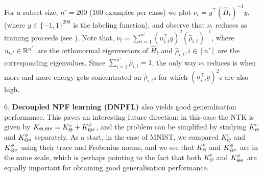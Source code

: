 For a subset size, $n'=200$ ($100$ examples per class) we plot $\nu_t=y^\top (\widehat{H}_t)^{-1} y$, (where $y\in\{-1,1\}^{200}$ is the labeling function), and observe that $\nu_t$ reduces as training proceeds (see ). Note that, $\nu_t=\sum_{i=1}^{n'}(u_{i,t}^\top y)^2 (\hat{\rho}_{i,t})^{-1}$, where $u_{i,t}\in \mathbb{R}^{n'}$ are the orthonormal eigenvectors of $\widehat{H}_t$ and $\hat{\rho}_{i,t},i\in[n']$ are the corresponding eigenvalues. Since $\sum_{i=1}^{n'}\hat{\rho}_{i,t}=1$, the only way $\nu_t$ reduces is when more and more energy gets concentrated on $\hat{\rho}_{i,t}$s for which $(u_{i,t}^\top y)^2$s are also high.\WFclear%

$6.$ \textbf{Decoupled NPF learning (DNPFL)} also yields good generalisation performance. This paves an interesting future direction:  in this case the NTK is given by $K_{\Theta,{\Theta}^g}=K^v_{\Theta}+K^{\phi}_{{\Theta}^g}$, and the problem can be simplified by studying $K^v_{\Theta}$ and $K^{\phi}_{{\Theta}^g}$ separately. As a start, in the case of MNIST, we compared $K^v_{\Theta}$ and $K^{\phi}_{{\Theta}^g}$ using their trace and Frobenius norms, and we see that $K^v_{\Theta}$ and $K^{\phi}_{{\Theta}^g}$ are in the same scale, which is perhaps pointing to the fact that both $K^v_{\Theta}$ and $K^{\phi}_{{\Theta}^g}$ are equally important for obtaining good generalisation performance. 

